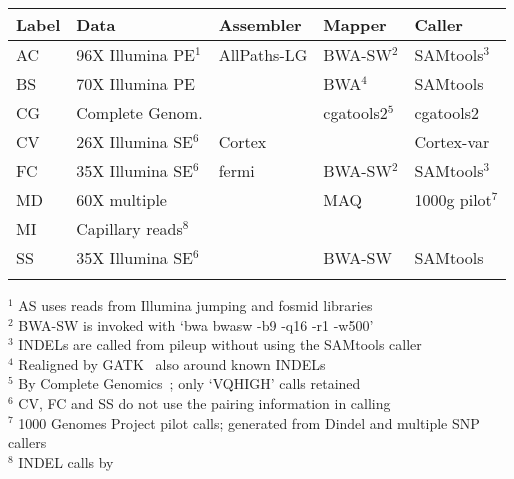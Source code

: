 \documentclass{bioinfo}
\begin{document}
\begin{table}[t]
{\begin{tabular}{lllll}
\toprule
Label & Data & Assembler & Mapper & Caller \\
\midrule
AC & 96X Illumina PE$^1$ & AllPaths-LG & BWA-SW$^2$ & SAMtools$^3$ \\
BS & 70X Illumina PE & & BWA$^4$ & SAMtools \\
CG & Complete Genom.& & cgatools2$^5$ & cgatools2 \\
CV & 26X Illumina SE$^6$ & Cortex & & Cortex-var \\
FC & 35X Illumina SE$^6$ & fermi & BWA-SW$^2$ & SAMtools$^3$ \\
MD & 60X multiple        & & MAQ & 1000g pilot$^7$ \\
MI & Capillary reads$^8$     & &     & \\
SS & 35X Illumina SE$^6$ & & BWA-SW & SAMtools \\
\botrule
\end{tabular}}{
$^1$ AS uses reads from Illumina jumping and fosmid libraries\\
$^2$ BWA-SW is invoked with `bwa bwasw -b9 -q16 -r1 -w500'\\
$^3$ INDELs are called from pileup without using the SAMtools caller\\
$^4$ Realigned by GATK~\citep{Depristo:2011vn} also around known INDELs\\
$^5$ By Complete Genomics~\citep{Drmanac:2010ly}; only `VQHIGH' calls retained\\
$^6$ CV, FC and SS do not use the pairing information in calling\\
$^7$ 1000 Genomes Project pilot calls; generated from Dindel and multiple SNP callers\\
$^8$ INDEL calls by \citet{Mills:2011fk}\\
}
\end{table}
\end{document}
